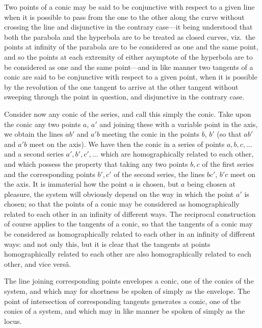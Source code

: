 \documentclass[11pt]{article}
\begin{document}
\smallskip

Two points of a conic may be said to be conjunctive with respect to a given
line when it is possible to pass from the one to the other along the curve without
crossing the line and disjunctive in the contrary case---it being understood that both
the parabola and the hyperbola are to be treated as closed curves, viz.\ the points at
infinity of the parabola are to be considered as one and the same point, and so the
points at each extremity of either asymptote of the hyperbola are to be considered
as one and the same point---and in like manner two tangents of a conic are said to
be conjunctive with respect to a given point, when it is possible by the revolution of
the one tangent to arrive at the other tangent without sweeping through the point
in question, and disjunctive in the contrary case.

\smallskip

Consider now any conic of the series, and call this simply the conic. Take upon
the conic any two points $a$, $a'$ and joining these with a variable point in the axis,
we obtain the lines $ab'$ and $a'b$ meeting the conic in the points $b$, $b'$ (so that $ab'$ and
$a'b$ meet on the axis). We have then the conic in a series of points $a, b, c, \ldots$ and a second
series $a', b', c', \ldots$ which are homographically related to each other, and which possess
the property that taking any two points $b, c$ of the first series and the corresponding
points $b', c'$ of the second series, the lines $bc'$, $b'c$ meet on the axis. It is immaterial
how the point $a$ is chosen, but $a$ being chosen at pleasure, the system will obviously
depend on the way in which the point $a'$ is chosen; so that the points of a conic
may be considered as homographically related to each other in an infinity of different
ways. The reciprocal construction of course applies to the tangents of a conic, so that
the tangents of a conic may be considered as homographically related to each other
in an infinity of different ways: and not only this, but it is clear that the tangents
at points homographically related to each other are also homographically related to
each other, and vice vers\^a.

\smallskip

The line joining corresponding points envelopes a conic, one of the conics of the
system, and which may for shortness be spoken of simply as the envelope. The point
of intersection of corresponding tangents generates a conic, one of the conics of a
system, and which may in like manner be spoken of simply as the locus.
\end{document}
